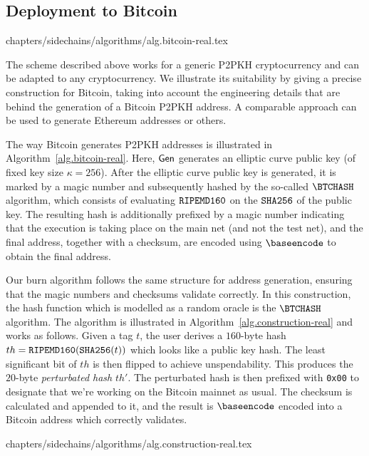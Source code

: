 \subsection{Deployment to Bitcoin}\label{sec.real}
{chapters/sidechains/algorithms/alg.bitcoin-real.tex}

The scheme described above works for a generic P2PKH cryptocurrency and can be adapted to any cryptocurrency. We illustrate its suitability by giving a precise construction for Bitcoin, taking into account the engineering details that are behind the generation of a Bitcoin P2PKH address. A comparable approach can be used to generate Ethereum addresses or others.

The way Bitcoin generates P2PKH addresses is illustrated in Algorithm~\ref{alg.bitcoin-real}. Here, $\mathsf{Gen}$ generates an elliptic curve public key (of fixed key size $\kappa = 256$). After the elliptic curve public key is generated, it is marked by a magic number and subsequently hashed by the so-called $\BTCHASH$ algorithm, which consists of evaluating $\texttt{RIPEMD160}$ on the $\mathtt{SHA256}$ of the public key. The resulting hash is additionally prefixed by a magic number indicating that the execution is taking place on the main net (and not the test net), and the final address, together with a checksum, are encoded using $\baseencode$ to obtain the final address.

Our burn algorithm follows the same structure for address generation, ensuring that the magic numbers and checksums validate correctly. In this construction, the hash function which is modelled as a random oracle is the $\BTCHASH$ algorithm. The algorithm is illustrated in Algorithm~\ref{alg.construction-real} and works as follows.
Given a tag $t$, the user derives a $160$-byte
hash $th = \texttt{RIPEMD160}(\mathtt{SHA256}(t))$ which looks like a public key hash.
The least significant bit of
$th$ is then flipped to achieve unspendability. This produces the $20$-byte
\emph{perturbated hash} $th'$. The perturbated hash
is then prefixed with \texttt{0x00} to designate that we're working on the Bitcoin mainnet as usual. The checksum is calculated and appended
to it, and the result is
$\baseencode$ encoded into a Bitcoin address which correctly validates.

{chapters/sidechains/algorithms/alg.construction-real.tex}
